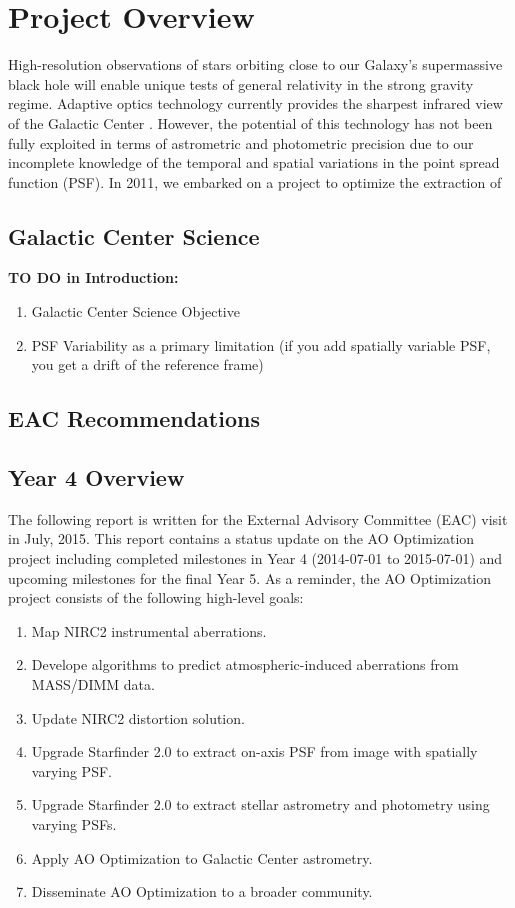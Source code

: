 \section{Project Overview}

High-resolution observations of stars orbiting close to our Galaxy's supermassive black hole will enable unique tests of general relativity in the strong gravity regime. Adaptive optics technology currently provides the sharpest infrared view of the Galactic Center \cite{Ghez_2005}. However, the potential of this technology has not been fully exploited in terms of astrometric and photometric precision due to our incomplete knowledge of the temporal and spatial variations in the point spread function (PSF). In 2011, we embarked on a project to optimize the extraction of  

\subsection{Galactic Center Science}

{\bf TO DO in Introduction:}
\begin{enumerate}
\item Galactic Center Science Objective
\item PSF Variability as a primary limitation (if you add spatially variable PSF, you get a drift of the reference frame)
\end{enumerate}

\subsection{EAC Recommendations}

\subsection{Year 4 Overview}
The following report is written for the External Advisory Committee (EAC) visit in July, 2015. This report contains a status update on the AO Optimization project including completed milestones in Year 4 (2014-07-01 to 2015-07-01) and upcoming milestones for the final Year 5. As a reminder, the AO Optimization project consists of the following high-level goals:
\begin{enumerate}
\item Map NIRC2 instrumental aberrations.
\item Develope algorithms to predict atmospheric-induced aberrations from MASS/DIMM data.
\item Update NIRC2 distortion solution.
\item Upgrade Starfinder 2.0 to extract on-axis PSF from image with spatially varying PSF.
\item Upgrade Starfinder 2.0 to extract stellar astrometry and photometry using varying PSFs.
\item Apply AO Optimization to Galactic Center astrometry.
\item Disseminate AO Optimization to a broader community.
\end{enumerate}




    
    
    
    
    
    
    
  
  